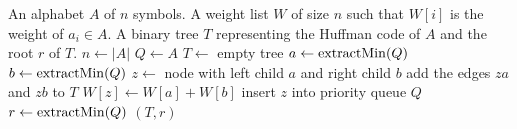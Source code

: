 
\begin{algorithmic}[1]
\Require An alphabet $A$ of $n$ symbols. A weight list $W$ of size $n$
  such that $W[i]$ is the weight of $a_i \in A$. 
\Ensure A binary tree $T$ representing the Huffman code of $A$ and the
  root $r$ of $T$.
\State $n \gets |A|$
\State $Q \gets A$\label{alg:Huffman_tree:initialize_priority_queue}
\State $T \gets$ empty tree\label{alg:Huffman_tree:empty_binary_tree}
  \State $a \gets \operatorname*{extractMin}(Q)$
  \State $b \gets \operatorname*{extractMin}(Q)$
  \State $z \gets$ node with left child $a$ and right child $b$
  \State add the edges $za$ and $zb$ to $T$
  \State $W[z] \gets W[a] + W[b]$
  \State insert $z$ into priority queue $Q$\label{alg:Huffman_tree:insert_into_queue}
\EndFor
\State $r \gets \operatorname*{extractMin}(Q)$\label{alg:Huffman_tree:extract_tree_root}
\State \Return $(T, r)$\label{alg:Huffman_tree:return_tree_and_root}
\end{algorithmic}
